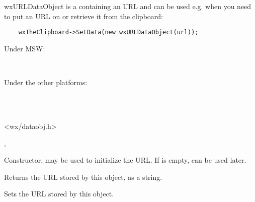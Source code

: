 
\section{}\label{wxurldataobject}

wxURLDataObject is a  containing an URL
and can be used e.g. when you need to put an URL on or retrieve it from the
clipboard:
\begin{verbatim}
    wxTheClipboard->SetData(new wxURLDataObject(url));
\end{verbatim}



Under MSW:

\\

Under the other platforms:

\\
\\


<wx/dataobj.h>


,\\



\label{wxurldataobjectctor}


Constructor, may be used to initialize the URL. If  is empty, 
 can be used later.


\label{wxurldataobjectgeturl}


Returns the URL stored by this object, as a string.


\label{wxurldataobjectseturl}


Sets the URL stored by this object.

